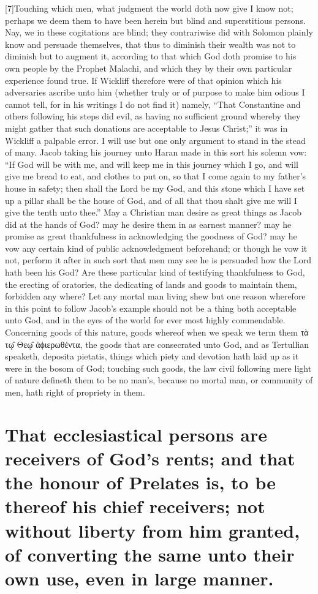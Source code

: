 [7]Touching which men, what judgment the world doth now give I know not; perhaps we deem them to have been herein but blind and superstitious persons. Nay, we in these cogitations are blind; they contrariwise did with Solomon plainly know and persuade themselves, that thus to diminish their wealth was not to diminish but to augment it, according to that which God doth promise to his own people by the Prophet Malachi, and which they by their own particular experience found true. If Wickliff therefore were of that  opinion which his adversaries ascribe unto him (whether truly or of purpose to make him odious I cannot tell, for in his writings I do not find it) namely, “That Constantine and others following his steps did evil, as having no sufficient ground whereby they might gather that such donations are acceptable to Jesus Christ;” it was in Wickliff a palpable error. I will use but one only argument to stand in the stead of many. Jacob taking his journey unto Haran made in this sort his solemn vow: “If God will be with me, and will keep me in this journey which I go, and will give me bread to eat, and clothes to put on, so that I come again to my father’s house in safety; then shall the Lord be my God, and this stone which I have set up a pillar shall be the house of God, and of all that thou shalt give me will I give the tenth unto thee.” May a Christian man desire as great things as Jacob did at the hands of God? may he desire them in as earnest manner? may he promise as great thankfulness  in acknowledging the goodness of God? may he vow any certain kind of public acknowledgment beforehand; or though he vow it not, perform it after in such sort that men may see he is persuaded how the Lord hath been his God? Are these particular kind of testifying thankfulness to God, the erecting of oratories, the dedicating of lands and goods to maintain them, forbidden any where? Let any mortal man living shew but one reason wherefore in this point to follow Jacob’s example should not be a thing both acceptable unto God, and in the eyes of the world for ever most highly commendable. Concerning goods of this nature, goods whereof when we speak we term them τὰ τῳ̑ Θεῳ̑ ἀϕιερωθέντα, the goods that are consecrated unto God, and as Tertullian speaketh, deposita pietatis, things which piety and devotion hath laid up as it were in the bosom of God; touching such goods, the law civil following mere light of nature defineth them to be no man’s, because no mortal man, or community of men, hath right of propriety in them.

\section*{That ecclesiastical persons are receivers of God’s rents; and that the honour of Prelates is, to be thereof his chief receivers; not without liberty from him granted, of converting the same unto their own use, even in large manner.}

